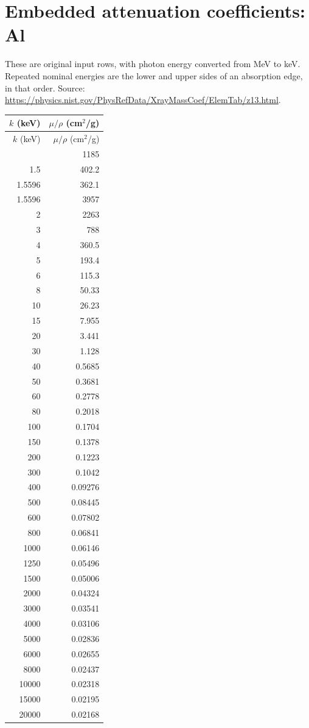 \documentclass[10pt,a4paper]{article}
\begin{document}
\section{Embedded attenuation coefficients: Al}
These are original input rows, with photon energy converted from MeV to keV. Repeated nominal energies are the lower and upper sides of an absorption edge, in that order. Source: \url{https://physics.nist.gov/PhysRefData/XrayMassCoef/ElemTab/z13.html}.
\small
\begin{longtable}{rr}
\toprule
$k$ (keV) & $\mu/\rho$ (cm$^2$/g) \\
\midrule
\endfirsthead
\toprule
$k$ (keV) & $\mu/\rho$ (cm$^2$/g) \\
\midrule
\endhead
\bottomrule
\endfoot
1 & 1185 \\
1.5 & 402.2 \\
1.5596 & 362.1 \\
1.5596 & 3957 \\
2 & 2263 \\
3 & 788 \\
4 & 360.5 \\
5 & 193.4 \\
6 & 115.3 \\
8 & 50.33 \\
10 & 26.23 \\
15 & 7.955 \\
20 & 3.441 \\
30 & 1.128 \\
40 & 0.5685 \\
50 & 0.3681 \\
60 & 0.2778 \\
80 & 0.2018 \\
100 & 0.1704 \\
150 & 0.1378 \\
200 & 0.1223 \\
300 & 0.1042 \\
400 & 0.09276 \\
500 & 0.08445 \\
600 & 0.07802 \\
800 & 0.06841 \\
1000 & 0.06146 \\
1250 & 0.05496 \\
1500 & 0.05006 \\
2000 & 0.04324 \\
3000 & 0.03541 \\
4000 & 0.03106 \\
5000 & 0.02836 \\
6000 & 0.02655 \\
8000 & 0.02437 \\
10000 & 0.02318 \\
15000 & 0.02195 \\
20000 & 0.02168 \\
\end{longtable}
\normalsize
\clearpage
\end{document}
